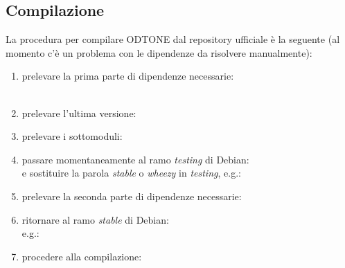 \subsection{Compilazione}
La procedura per compilare ODTONE dal repository ufficiale è la seguente (al momento c'è un problema con le dipendenze da risolvere manualmente\cite{snapshot}):\\
\begin{enumerate}

\item prelevare la prima parte di dipendenze necessarie:\\
\\

\item prelevare l'ultima versione:\\

\item prelevare i sottomoduli:\\

\item passare momentaneamente al ramo {\em testing} di Debian:\\
e sostituire la parola {\em stable} o {\em wheezy} in {\em testing}, e.g.:\\

\item prelevare la seconda parte di dipendenze necessarie:\\

\item ritornare al ramo {\em stable} di Debian:\\
e.g.:

\item procedere alla compilazione:\\

\end{enumerate}

